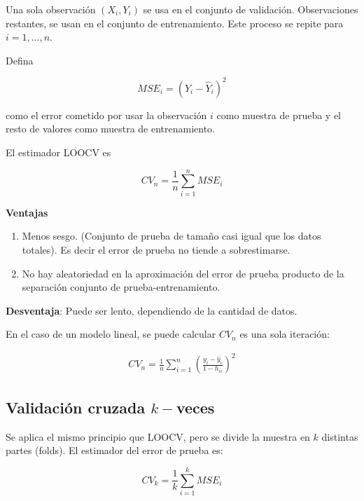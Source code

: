 \documentclass[
  12pt,
]{book}
\providecommand{\tightlist}{%
  \setlength{\itemsep}{0pt}\setlength{\parskip}{0pt}}
\begin{document}
Una sola observación \(\left( X_{i}, Y_{i} \right)\) se usa en el
conjunto de validación. Observaciones restantes, se usan en el conjunto
de entrenamiento. Este proceso se repite para \(i=1,\ldots,n\).

Defina

\begin{equation*}
MSE_{i} =(Y_{i}-\hat{Y}_{i})^{2}
\end{equation*}

como el error cometido por usar la observación \(i\) como muestra de
prueba y el resto de valores como muestra de entrenamiento.

El estimador LOOCV es

\begin{equation*}
CV_{n} = \frac{1}{n} \sum_{i=1}^{n} MSE_{i}
\end{equation*}

\textbf{Ventajas}

\begin{enumerate}
\def\labelenumi{\arabic{enumi}.}
\tightlist
\item
  Menos sesgo. (Conjunto de prueba de tamaño casi igual que los datos
  totales). Es decir el error de prueba no tiende a sobrestimarse.
\item
  No hay aleatoriedad en la aproximación del error de prueba producto de
  la separación conjunto de prueba-entrenamiento.
\end{enumerate}

\textbf{Desventaja}: Puede ser lento, dependiendo de la cantidad de
datos.

En el caso de un modelo lineal, se puede calcular \(CV_n\) es una sola
iteración:

\begin{align*}
CV_n=\frac 1 n \sum_{i=1}^n\left(\frac{y_i-\hat y_i}{1-h_{ii}}\right)^2
\end{align*}

\hypertarget{validaciuxf3n-cruzada-k-veces}{%
\subsection{\texorpdfstring{Validación cruzada
\(k-\)veces}{Validación cruzada k-veces}}\label{validaciuxf3n-cruzada-k-veces}}

Se aplica el mismo principio que LOOCV, pero se divide la muestra en
\(k\) distintas partes (folds). El estimador del error de prueba es:

\begin{equation*}
CV_{k} = \frac{1}{k} \sum_{i=1}^{k} MSE_{i}
\end{equation*}
\end{document}
